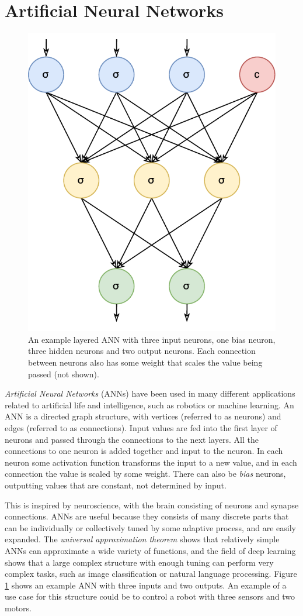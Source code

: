 \section{Artificial Neural Networks}
\begin{figure}
\centering
\includegraphics[width=.5\columnwidth]{fig/Artificial_neural_network}
\caption[Example ANN]{
    An example layered ANN with three input neurons, one bias neuron, three hidden neurons and two output neurons.
    Each connection between neurons also has some weight that scales the value being passed (not shown).
}
\label{fig:ann}
\end{figure}

\textit{Artificial Neural Networks} (ANNs) \cite[Chapter 1]{bengio2015deep} have been used in many different applications related to artificial life and intelligence,
such as robotics or machine learning.
An ANN is a directed graph structure, with vertices (referred to as neurons) and edges (referred to as connections).
Input values are fed into the first layer of neurons and passed through the connections to the next layers.
All the connections to one neuron is added together and input to the neuron.
In each neuron some activation function transforms the input to a new value, and in each connection the value is scaled by some weight.
There can also be \textit{bias} neurons, outputting values that are constant, not determined by input.

This is inspired by neuroscience, with the brain consisting of neurons and synapse connections.
ANNs are useful because they consists of many discrete parts that can be individually or collectively tuned by some adaptive process,
and are easily expanded.
The \textit{universal approximation theorem} \cite{Hornik1989359} shows that relatively simple ANNs can approximate a wide variety of functions,
and the field of deep learning shows that a large complex structure with enough tuning can perform very complex tasks, such as image classification or natural language processing.
Figure \ref{fig:ann} shows an example ANN with three inputs and two outputs.
An example of a use case for this structure could be to control a robot with three sensors and two motors.


